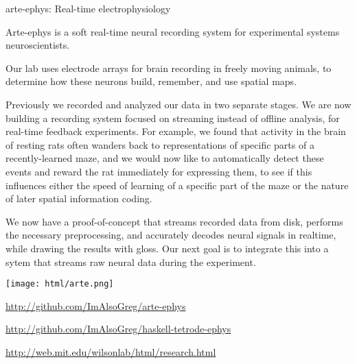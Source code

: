 \begin{hcarentry}[new]{arte-ephys: Real-time electrophysiology}
\makeheader

Arte-ephys is a soft real-time neural recording system for experimental
systems neuroscientists.

Our lab uses electrode arrays for brain recording in freely moving animals, to
determine how these neurons build, remember, and use spatial maps.

Previously we recorded and analyzed our data in two separate stages.  We are
now building a recording system focused on streaming instead of offline
analysis, for real-time feedback experiments.  For example, we found that
activity in the brain of resting rats often wanders back to representations of
specific parts of a recently-learned maze, and we would now like to
automatically detect these events and reward the rat immediately for
expressing them, to see if this influences either the speed of learning of a
specific part of the maze or the nature of later spatial information coding.

We now have a proof-of-concept that streams recorded data from disk, performs the necessary preprocessing, and accurately decodes neural signals in realtime, while drawing the results with gloss. Our next goal is to integrate this into a sytem that streams raw neural data during the experiment.

\begin{center}
\texttt{[image: html/arte.png]}
\end{center}

\FurtherReading
\begin{compactitem}
\item \url{http://github.com/ImAlsoGreg/arte-ephys}
\item \url{http://github.com/ImAlsoGreg/haskell-tetrode-ephys}
\item \url{http://web.mit.edu/wilsonlab/html/research.html}
\end{compactitem}
\end{hcarentry}
